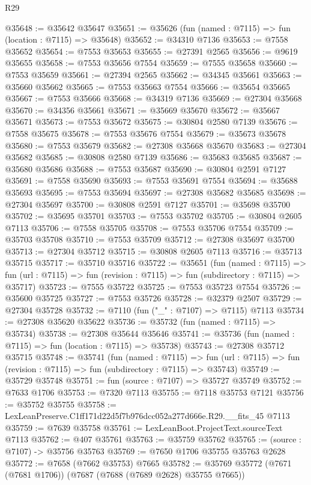 \begin{lexlean}{R29}
\begin{coremodule}
@35648 := @35642 @35647
@35651 := @35626 (fun (named : @7115) => fun (location : @7115) => @35648)
@35652 := @34310 @7136
@35653 := @7558 @35652
@35654 := @7553 @35653
@35655 := @27391 @2565
@35656 := @9619 @35655
@35658 := @7553 @35656 @7554
@35659 := @7555 @35658
@35660 := @7553 @35659
@35661 := @27394 @2565
@35662 := @34345 @35661
@35663 := @35660 @35662
@35665 := @7553 @35663 @7554
@35666 := @35654 @35665
@35667 := @7553 @35666
@35668 := @34319 @7136
@35669 := @27304 @35668
@35670 := @34356 @35661
@35671 := @35669 @35670
@35672 := @35667 @35671
@35673 := @7553 @35672
@35675 := @30804 @2580 @7139
@35676 := @7558 @35675
@35678 := @7553 @35676 @7554
@35679 := @35673 @35678
@35680 := @7553 @35679
@35682 := @27308 @35668 @35670
@35683 := @27304 @35682
@35685 := @30808 @2580 @7139
@35686 := @35683 @35685
@35687 := @35680 @35686
@35688 := @7553 @35687
@35690 := @30804 @2591 @7127
@35691 := @7558 @35690
@35693 := @7553 @35691 @7554
@35694 := @35688 @35693
@35695 := @7553 @35694
@35697 := @27308 @35682 @35685
@35698 := @27304 @35697
@35700 := @30808 @2591 @7127
@35701 := @35698 @35700
@35702 := @35695 @35701
@35703 := @7553 @35702
@35705 := @30804 @2605 @7113
@35706 := @7558 @35705
@35708 := @7553 @35706 @7554
@35709 := @35703 @35708
@35710 := @7553 @35709
@35712 := @27308 @35697 @35700
@35713 := @27304 @35712
@35715 := @30808 @2605 @7113
@35716 := @35713 @35715
@35717 := @35710 @35716
@35722 := @35651
    (fun (named : @7115) =>
    fun (url : @7115) => fun (revision : @7115) => fun (subdirectory : @7115) => @35717)
@35723 := @7555 @35722
@35725 := @7553 @35723 @7554
@35726 := @35600 @35725
@35727 := @7553 @35726
@35728 := @32379 @2507
@35729 := @27304 @35728
@35732 := @7110 (fun ("_" : @7107) => @7115) @7113
@35734 := @27308 @35620 @35622
@35736 := @35732 (fun (named : @7115) => @35734)
@35738 := @27308 @35644 @35646
@35741 := @35736 (fun (named : @7115) => fun (location : @7115) => @35738)
@35743 := @27308 @35712 @35715
@35748 := @35741
    (fun (named : @7115) =>
    fun (url : @7115) => fun (revision : @7115) => fun (subdirectory : @7115) => @35743)
@35749 := @35729 @35748
@35751 := fun (source : @7107) => @35727 @35749
@35752 := @7633 @1706
@35753 := @7320 @7113
@35755 := @7118 @35753 @7121
@35756 := @35752 @35755
@35758 := LexLeanPreserve.C1ff171d22d5f7b976dcc052a277d666e.R29.__fits_45 @7113
@35759 := @7639 @35758
@35761 := LexLeanBoot.ProjectText.sourceText @7113
@35762 := @407 @35761
@35763 := @35759 @35762
@35765 := (source : @7107) -> @35756 @35763
@35769 := @7650 @1706 @35755 @35763 @2628
@35772 := @7658 (@7662 @35753) @7665
@35782 := @35769 @35772 (@7671 (@7681 @1706)) (@7687 (@7688 (@7689 @2628) @35755 @7665))

\end{coremodule}
\end{lexlean}
